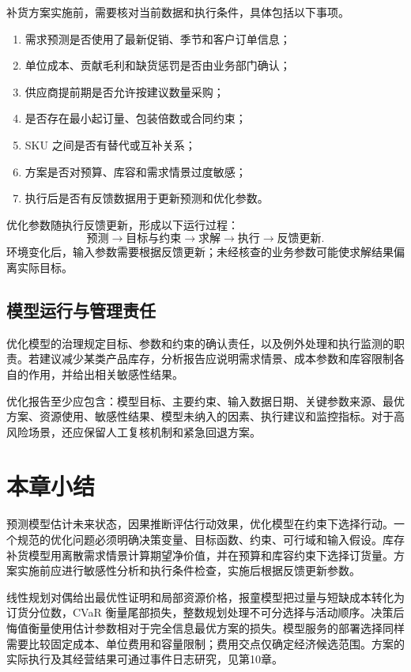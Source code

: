 补货方案实施前，需要核对当前数据和执行条件，具体包括以下事项。
\begin{enumerate}
  \item 需求预测是否使用了最新促销、季节和客户订单信息；
  \item 单位成本、贡献毛利和缺货惩罚是否由业务部门确认；
  \item 供应商提前期是否允许按建议数量采购；
  \item 是否存在最小起订量、包装倍数或合同约束；
  \item SKU 之间是否有替代或互补关系；
  \item 方案是否对预算、库容和需求情景过度敏感；
  \item 执行后是否有反馈数据用于更新预测和优化参数。
\end{enumerate}

优化参数随执行反馈更新，形成以下运行过程：
\[
\text{预测}
\rightarrow
\text{目标与约束}
\rightarrow
\text{求解}
\rightarrow
\text{执行}
\rightarrow
\text{反馈更新}.
\]
环境变化后，输入参数需要根据反馈更新；未经核查的业务参数可能使求解结果偏离实际目标。

\subsection{模型运行与管理责任}

优化模型的治理规定目标、参数和约束的确认责任，以及例外处理和执行监测的职责。若建议减少某类产品库存，分析报告应说明需求情景、成本参数和库容限制各自的作用，并给出相关敏感性结果。

优化报告至少应包含：模型目标、主要约束、输入数据日期、关键参数来源、最优方案、资源使用、敏感性结果、模型未纳入的因素、执行建议和监控指标。对于高风险场景，还应保留人工复核机制和紧急回退方案。

\section*{本章小结}

预测模型估计未来状态，因果推断评估行动效果，优化模型在约束下选择行动。一个规范的优化问题必须明确决策变量、目标函数、约束、可行域和输入假设。库存补货模型用离散需求情景计算期望净价值，并在预算和库容约束下选择订货量。方案实施前应进行敏感性分析和执行条件检查，实施后根据反馈更新参数。

线性规划对偶给出最优性证明和局部资源价格，报童模型把过量与短缺成本转化为订货分位数，CVaR 衡量尾部损失，整数规划处理不可分选择与活动顺序。决策后悔值衡量使用估计参数相对于完全信息最优方案的损失。模型服务的部署选择同样需要比较固定成本、单位费用和容量限制；费用交点仅确定经济候选范围。方案的实际执行及其经营结果可通过事件日志研究，见第10章。

